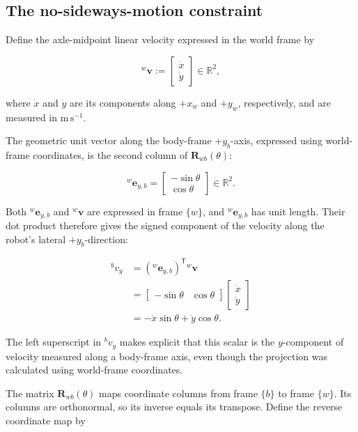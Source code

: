 \documentclass[
  australian,
  12pt,
  letterpaper,
  DIV=11,
  numbers=noendperiod,
  twoside]{scrreprt}
\begin{document}
\subsection{The no-sideways-motion
constraint}\label{the-no-sideways-motion-constraint}

Define the axle-midpoint linear velocity expressed in the world frame by

\[
{}^{w}\mathbf v
\mathrel{:=}
\begin{bmatrix}
\dot x\\
\dot y
\end{bmatrix}
\in\mathbb R^2,
\]

where \(\dot x\) and \(\dot y\) are its components along \(+x_w\) and
\(+y_w\), respectively, and are measured in \(\mathrm{m\,s^{-1}}\).

The geometric unit vector along the body-frame \(+y_b\)-axis, expressed
using world-frame coordinates, is the second column of
\(\mathbf R_{wb}(\theta)\):

\[
{}^{w}\mathbf e_{y,b}
=
\begin{bmatrix}
-\sin\theta\\
\cos\theta
\end{bmatrix}
\in\mathbb R^2.
\]

Both \({}^{w}\mathbf e_{y,b}\) and \({}^{w}\mathbf v\) are expressed in
frame \(\{w\}\), and \({}^{w}\mathbf e_{y,b}\) has unit length. Their
dot product therefore gives the signed component of the velocity along
the robot's lateral \(+y_b\)-direction:

\[
\begin{aligned}
{}^{b}v_y
&=
({}^{w}\mathbf e_{y,b})^{\mathsf T}{}^{w}\mathbf v\\
&=
\begin{bmatrix}
-\sin\theta & \cos\theta
\end{bmatrix}
\begin{bmatrix}
\dot x\\
\dot y
\end{bmatrix}\\
&=
-\dot x\sin\theta+
\dot y\cos\theta.
\end{aligned}
\]

The left superscript in \({}^{b}v_y\) makes explicit that this scalar is
the \(y\)-component of velocity measured along a body-frame axis, even
though the projection was calculated using world-frame coordinates.

The matrix \(\mathbf R_{wb}(\theta)\) maps coordinate columns from frame
\(\{b\}\) to frame \(\{w\}\). Its columns are orthonormal, so its
inverse equals its transpose. Define the reverse coordinate map by
\end{document}
